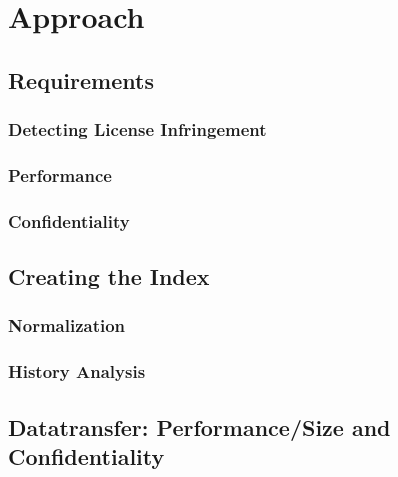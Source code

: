 
\chapter{Approach}\label{chapter:approach}
\section{Requirements}
\subsection{Detecting License Infringement}
\subsection{Performance}
\subsection{Confidentiality}
\section{Creating the Index}
\subsection{Normalization}
\subsection{History Analysis}
\section{Datatransfer: Performance/Size and Confidentiality}